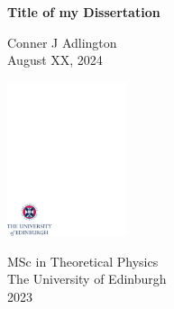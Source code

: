 \documentclass[
12pt,
a4paper,
]{report}
\begin{document}
\begin{titlepage}
\vspace*{0.1\textheight}

\begin{center}
        \huge{\bfseries Title of my Dissertation}\\ %
\end{center}

\medskip

\begin{center}
        \Large{Conner J Adlington}\\  %
        \medskip
        \large{August XX, 2024}  %
\end{center}


\vspace*{0.3\textheight}

\begin{center}
        \includegraphics[width=35mm]{../crest.pdf}
\end{center}

\medskip

\begin{center}

\large{
  MSc in Theoretical Physics\\[0.8ex]
  The University of Edinburgh\\[0.8ex]
  2023}

\end{center}

\end{titlepage}
\end{document}
